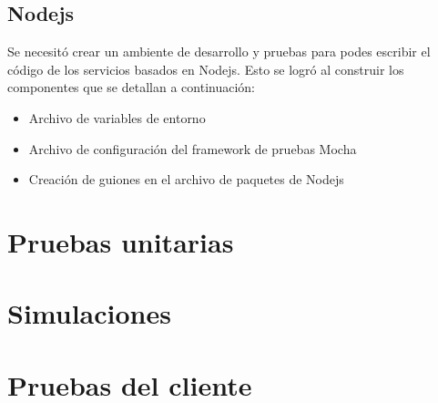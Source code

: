 \subsection{Nodejs}
Se necesitó crear un ambiente de desarrollo y pruebas para podes escribir el código de los servicios basados en Nodejs.
Esto se logró al construir los componentes que se detallan a continuación:
\begin{itemize}
	\item Archivo de variables de entorno
	\item Archivo de configuración del framework de pruebas Mocha
	\item Creación de guiones en el archivo de paquetes de Nodejs
\end{itemize}



\section{Pruebas unitarias}

\section{Simulaciones}

\section{Pruebas del cliente}
